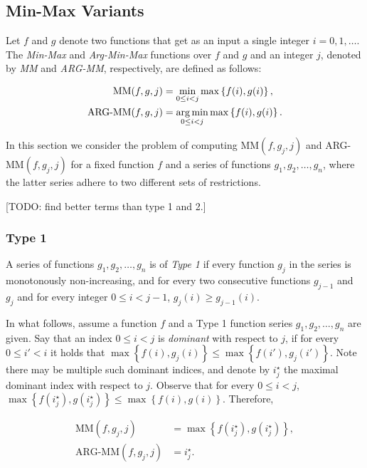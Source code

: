 \subsection{Min-Max Variants}

Let $f$ and $g$ denote two functions that get as an input a single integer $i = 0, 1, \ldots$. The \emph{Min-Max} and \emph{Arg-Min-Max} functions over $f$ and $g$ and an integer $j$, denoted by \emph{MM} and \emph{ARG-MM}, respectively, are defined as follows:

\begin{align}
	\text{MM}(f, g, j) &= \min_{0 \leq i < j} \max \left\{f(i), g(i)\right\}, 
	\label{eq:MM} \\
	\text{ARG-MM}(f, g, j) &= \operatorname*{arg\,min}_{0 \leq i < j} \max \left\{f(i), g(i)\right\}.
	\label{eq:ARG-MM}
\end{align}


In this section we consider the problem of computing MM$(f, g_j, j)$ and ARG-MM$(f, g_j, j)$ for a fixed function $f$ and a series of functions $g_1, g_2, \ldots, g_n$, where the latter series adhere to two different sets of restrictions. 

[TODO: find better terms than type 1 and 2.]

\subsubsection{Type 1}

A series of functions $g_1, g_2, \ldots, g_n$ is of \emph{Type 1} if every function $g_j$ in the series is monotonously non-increasing, and for every two consecutive functions $g_{j-1}$ and $g_j$ and for every integer $0 \leq i < j-1$, $g_j(i) \geq g_{j-1}(i)$.

In what follows, assume a function $f$ and a Type 1 function series $g_1, g_2, \ldots, g_n$ are given.
Say that an index $0 \leq i < j$ is \emph{dominant} with respect to $j$, if for every $0 \leq i' < i$ it holds that $\max\left\{f(i), g_j(i)\right\} \leq \max\left\{f(i'), g_j(i')\right\}$. Note there may be multiple such dominant indices, and denote by $i^\star_j$ the maximal dominant index with respect to $j$. Observe that for every $0 \leq i < j$, $\max\left\{f(i^\star_j), g(i^\star_j)\right\} \leq \max\left\{f(i), g(i)\right\}$. Therefore, 

\begin{align}
	\text{MM}(f, g_j, j) &= \max\left\{f(i^\star_j), g(i^\star_j)\right\},
	\label{eq:MM1} \\
	\text{ARG-MM}(f, g_j, j) &= i^\star_j.
	\label{eq:ARG-MM1} 
\end{align}

